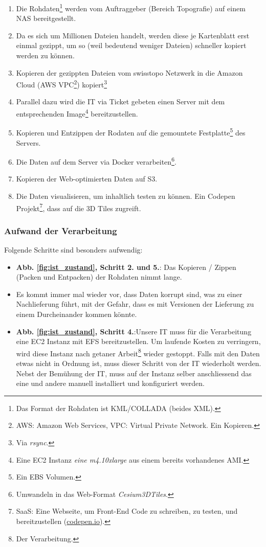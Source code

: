 \begin{enumerate}
\item Die Rohdaten\footnote{Das Format der Rohdaten ist KML/COLLADA (beides XML).} werden vom Auftraggeber (Bereich Topografie) auf einem NAS bereitgestellt.
\item Da es sich um Millionen Dateien handelt, werden diese je Kartenblatt erst einmal gezippt, um so (weil bedeutend weniger Dateien) schneller kopiert werden zu können.
\item Kopieren der gezippten Dateien vom swisstopo Netzwerk in die Amazon Cloud (AWS VPC\footnote{AWS: Amazon Web Services, VPC: Virtual Private Network. Ein Kopieren.}) kopiert\footnote{Via \emph{rsync}.}
\item Parallel dazu wird die IT via Ticket gebeten einen Server mit dem entsprechenden Image\footnote{Eine EC2 Instanz \emph{eine m4.10xlarge} aus einem bereits vorhandenes AMI.} bereitzustellen.
\item Kopieren und Entzippen der Rodaten auf die gemountete Festplatte\footnote{Ein EBS Volumen.} des Servers.
\item Die Daten auf dem Server via Docker verarbeiten\footnote{Umwandeln in das Web-Format \emph{Cesium3DTiles}.}.
\item Kopieren der Web-optimierten Daten auf S3.
\item Die Daten visualisieren, um inhaltlich testen zu können. Ein Codepen Projekt\footnote{SaaS: Eine Webseite, um Front-End Code zu schreiben, zu testen, und bereitzustellen (\href{https://codepen.io}{codepen.io}).}, dass auf die 3D Tiles zugreift.
\end{enumerate}

\subsubsection{Aufwand der Verarbeitung}
\label{aufwand_prozessierung}
Folgende Schritte sind besonders aufwendig:
\begin{itemize}
\item \textbf{Abb. \ref{fig:ist_zustand}, Schritt 2. und 5.}: Das Kopieren / Zippen (Packen und Entpacken) der Rohdaten nimmt lange.
\item Es kommt immer mal wieder vor, dass Daten korrupt sind, was zu einer Nachlieferung führt, mit der Gefahr, dass es mit Versionen der Lieferung zu einem Durcheinander kommen könnte.
\item \textbf{Abb. \ref{fig:ist_zustand}, Schritt 4.}:Unsere IT muss für die Verarbeitung eine EC2 Instanz mit EFS bereitzustellen. Um laufende Kosten zu verringern, wird diese Instanz nach getaner Arbeit\footnote{Der Verarbeitung.} wieder gestoppt. Falls mit den Daten etwas nicht in Ordnung ist, muss dieser Schritt von der IT wiederholt werden. Nebst der Bemühung der IT, muss auf der Instanz selber anschliessend das eine und andere manuell installiert und konfiguriert werden.
\end{itemize}

